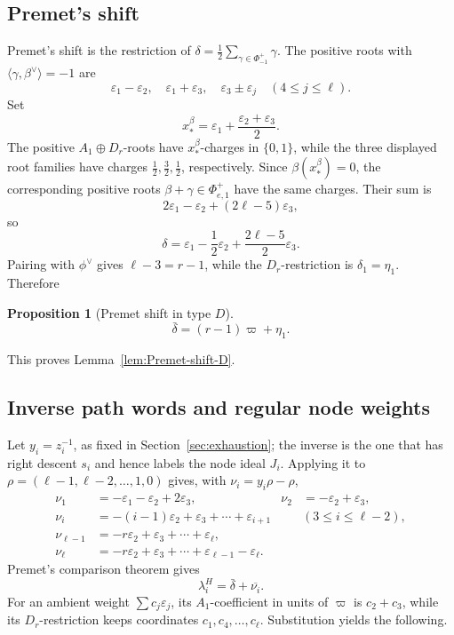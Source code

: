 \documentclass[11pt]{amsart}
\newtheorem{proposition}[theorem]{Proposition}
\theoremstyle{remark}
\numberwithin{equation}{section}
\begin{document}
\subsection{Premet's shift}

Premet's shift is the restriction of
\(\delta=\frac12\sum_{\gamma\in\Phi^+_{-1}}\gamma\).  The positive roots
with \(\langle\gamma,\beta^\vee\rangle=-1\) are
\[
   \varepsilon_1-\varepsilon_2,
   \quad
   \varepsilon_1+\varepsilon_3,
   \quad
   \varepsilon_3\pm\varepsilon_j\quad(4\le j\le\ell).
\]
Set
\[
 x_*^\beta=\varepsilon_1+\frac{\varepsilon_2+\varepsilon_3}{2}.
\]
The positive \(A_1\oplus D_r\)-roots have \(x_*^\beta\)-charges in
\(\{0,1\}\), while the three displayed root families have charges
\(\frac12,\frac32,\frac12\), respectively.  Since
\(\beta(x_*^\beta)=0\), the corresponding positive roots
\(\beta+\gamma\in\Phi^+_{e,1}\) have the same charges.
Their sum is
\[
   2\varepsilon_1-\varepsilon_2+(2\ell-5)\varepsilon_3,
\]
so
\[
   \delta=
   \varepsilon_1-\frac12\varepsilon_2
   +\frac{2\ell-5}{2}\varepsilon_3.
\]
Pairing with \(\phi^\vee\) gives \(\ell-3=r-1\), while the
\(D_r\)-restriction is \(\delta_1=\eta_1\).  Therefore
\begin{proposition}[Premet shift in type \(D\)]
\begin{equation}
\label{eq:appendix-D-Premet-shift}
   \bar\delta=(r-1)\varpi+\eta_1.
\end{equation}
\end{proposition}
This proves Lemma~\ref{lem:Premet-shift-D}.

\subsection{Inverse path words and regular node weights}

Let \(y_i=z_i^{-1}\), as fixed in Section~\ref{sec:exhaustion}; the
inverse is the one that has right descent \(s_i\) and hence labels the node
ideal \(J_i\).  Applying it to
\(\rho=(\ell-1,\ell-2,\ldots,1,0)\) gives, with \(\nu_i=y_i\rho-\rho\),
\begin{align}
 \nu_1&=-\varepsilon_1-\varepsilon_2+2\varepsilon_3,
 &\nu_2&=-\varepsilon_2+\varepsilon_3,\label{eq:appendix-D-nu12}\\
 \nu_i&=-(i-1)\varepsilon_2+
        \varepsilon_3+\cdots+\varepsilon_{i+1}
 &&(3\le i\le\ell-2),\\
 \nu_{\ell-1}&=-r\varepsilon_2+
       \varepsilon_3+\cdots+\varepsilon_\ell,\\
 \nu_\ell&=-r\varepsilon_2+
       \varepsilon_3+\cdots+\varepsilon_{\ell-1}-\varepsilon_\ell.
       \label{eq:appendix-D-nusp2}
\end{align}
Premet's comparison theorem gives
\[
   \lambda_i^H=\bar\delta+\overline{\nu_i}.
\]
For an ambient weight \(\sum c_j\varepsilon_j\), its \(A_1\)-coefficient
in units of \(\varpi\) is \(c_2+c_3\), while its \(D_r\)-restriction keeps
coordinates \(c_1,c_4,\ldots,c_\ell\).  Substitution yields the following.
\end{document}
